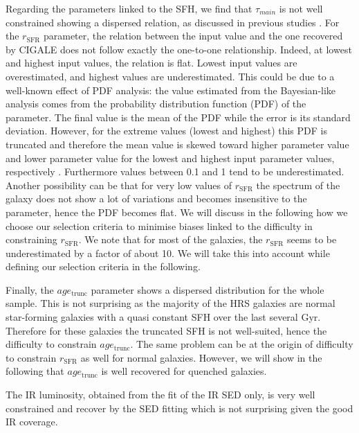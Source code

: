 \documentclass[traditabstract]{aa} %
\begin{document}
Regarding the parameters linked to the SFH, we find that $\tau_{main}$ is not well constrained showing a dispersed relation, as discussed in previous studies \citep[e.g.,][]{Buat14,Ciesla16}.
For the $r_{\mathrm{SFR}}$ parameter, the relation between the input value and the one recovered by CIGALE does not follow exactly the one-to-one relationship.
Indeed, at lowest and highest input values, the relation is flat.
Lowest input values are overestimated, and highest values are underestimated.
This could be due to a well-known effect of PDF analysis:
the value estimated from the Bayesian-like analysis comes from the probability distribution function (PDF) of the parameter.
The final value is the mean of the PDF while the error is its standard deviation.
However, for the extreme values (lowest and highest) this PDF is truncated and therefore the mean value is skewed toward higher parameter value and lower parameter value for the lowest and highest input parameter values, respectively \citep[e.g.][]{Noll09,Buat12,Ciesla15}.
Furthermore values between 0.1 and 1 tend to be underestimated.
Another possibility can be that for very low values of $r_{\mathrm{SFR}}$ the spectrum of the galaxy does not show a lot of variations and becomes insensitive to the parameter, hence the PDF becomes flat.
We will discuss in the following how we choose our selection criteria to minimise biases linked to the difficulty in constraining $r_{\mathrm{SFR}}$.
We note that for most of the galaxies, the $r_{\mathrm{SFR}}$ seems to be underestimated by a factor of about 10.
We will take this into account while defining our selection criteria in the following.

Finally, the $age_{\mathrm{trunc}}$ parameter shows a dispersed distribution for the whole sample.
This is not surprising as the majority of the HRS galaxies are normal star-forming galaxies with a quasi constant SFH over the last several Gyr.
Therefore for these galaxies the truncated SFH is not well-suited, hence the difficulty to constrain $age_{\mathrm{trunc}}$.
The same problem can be at the origin of difficulty to constrain $r_{\mathrm{SFR}}$ as well for normal galaxies.
However, we will show in the following that $age_{\mathrm{trunc}}$ is well recovered for quenched galaxies.

The IR luminosity, obtained from the fit of the IR SED only, is very well constrained and recover by the SED fitting which is not surprising given the good IR coverage.
\end{document}
